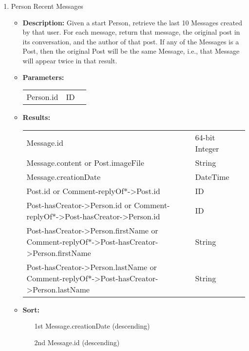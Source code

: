 {\begin{enumerate}
  \item Person Recent Messages
    \begin{itemize}
      \item \textbf{Description:}
        Given a start Person, retrieve the last 10 Messages created by that user.
        For each message, return that message, the original post in its conversation, and the author of that post.
        If any of the Messages is a Post, then the original Post will be the same Message, i.e., that Message will appear twice in that result.
      \item \textbf{Parameters:} \\
        \begin{tabular}{lll}
          Person.id 										& ID \\
        \end{tabular}
      \item \textbf{Results:} \\
        \begin{tabular}{lll}
          Message.id     									& 64-bit Integer \\
          Message.content or Post.imageFile										& String \\
          Message.creationDate  & DateTime \\
          Post.id or Comment-replyOf*->Post.id								& ID \\
          Post-hasCreator->Person.id or Comment-replyOf*->Post-hasCreator->Person.id & ID \\
          Post-hasCreator->Person.firstName or Comment-replyOf*->Post-hasCreator->Person.firstName & String \\
          Post-hasCreator->Person.lastName or Comment-replyOf*->Post-hasCreator->Person.lastName & String \\
        \end{tabular}
      \item \textbf{Sort:}
        \begin{itemize}
          \item[1st] Message.creationDate (descending)
          \item[2nd] Message.id (descending)
        \end{itemize}
    \end{itemize}


\end{enumerate}}

